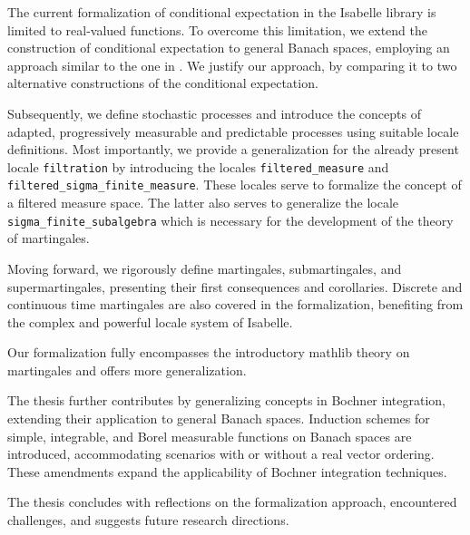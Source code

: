 The current formalization of conditional expectation in the Isabelle library is limited to real-valued functions. To overcome this limitation, we extend the construction of conditional expectation to general Banach spaces, employing an approach similar to the one in \cite{Hytoenen_2016}. We justify our approach, by comparing it to two alternative constructions of the conditional expectation.

Subsequently, we define stochastic processes and introduce the concepts of adapted, progressively measurable and predictable processes using suitable locale definitions. Most importantly, we provide a generalization for the already present locale \lstinline{filtration} by introducing the locales \lstinline{filtered_measure} and \lstinline{filtered_sigma_finite_measure}. These locales serve to formalize the concept of a filtered measure space. The latter also serves to generalize the locale \lstinline{sigma_finite_subalgebra} which is necessary for the development of the theory of martingales. 

Moving forward, we rigorously define martingales, submartingales, and supermartingales, presenting their first consequences and corollaries. Discrete and continuous time martingales are also covered in the formalization, benefiting from the complex and powerful locale system of Isabelle.

Our formalization fully encompasses the introductory \textsf{mathlib} theory on martingales and offers more generalization.

The thesis further contributes by generalizing concepts in Bochner integration, extending their application to general Banach spaces. Induction schemes for simple, integrable, and Borel measurable functions on Banach spaces are introduced, accommodating scenarios with or without a real vector ordering. These amendments expand the applicability of Bochner integration techniques.

The thesis concludes with reflections on the formalization approach, encountered challenges, and suggests future research directions.